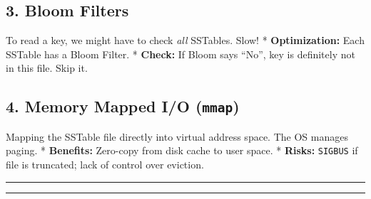 \hypertarget{bloom-filters}{%
\subsection{3. Bloom Filters}\label{bloom-filters}}

To read a key, we might have to check \emph{all} SSTables. Slow! *
\textbf{Optimization:} Each SSTable has a Bloom Filter. *
\textbf{Check:} If Bloom says ``No'', key is definitely not in this
file. Skip it.

\hypertarget{memory-mapped-io-mmap}{%
\subsection{\texorpdfstring{4. Memory Mapped I/O
(\texttt{mmap})}{4. Memory Mapped I/O (mmap)}}\label{memory-mapped-io-mmap}}

Mapping the SSTable file directly into virtual address space. The OS
manages paging. * \textbf{Benefits:} Zero-copy from disk cache to user
space. * \textbf{Risks:} \passthrough{\lstinline!SIGBUS!} if file is
truncated; lack of control over eviction.

\begin{center}\rule{0.5\linewidth}{0.5pt}\end{center}

\begin{center}\rule{0.5\linewidth}{0.5pt}\end{center}
